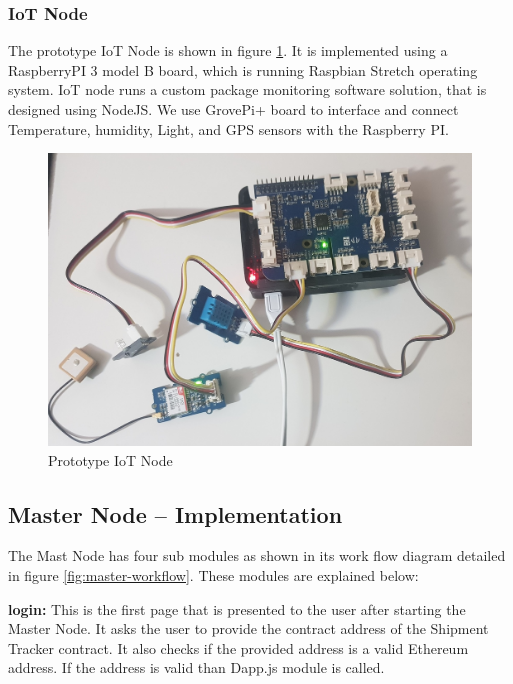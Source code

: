 \subsubsection{IoT Node}
The prototype IoT Node is shown in figure \ref{fig:piIoT}. It is implemented using a RaspberryPI 3 model B board, which is running Raspbian Stretch operating system. IoT node runs a custom package monitoring software solution, that is designed using NodeJS. We use GrovePi+ board to interface and connect Temperature, humidity, Light, and GPS sensors with the Raspberry PI.

\begin{figure}[h]
	\centering
    \includegraphics[width=130mm,scale=1]{figs/piIoT}
	\caption{Prototype IoT Node}
	\label{fig:piIoT} 
\end{figure}
\clearpage


\subsection{Master Node – Implementation} \label{IMN} 
The Mast Node has four sub modules as shown in its work flow diagram detailed in figure \ref{fig:master-workflow}. These modules are explained below:

\textbf{login:}
This is the first page that is presented to the user after starting the Master Node. It asks the user to provide the contract address of the Shipment Tracker contract. It also checks if the provided address is a valid Ethereum address. If the address is valid than Dapp.js module is called.


